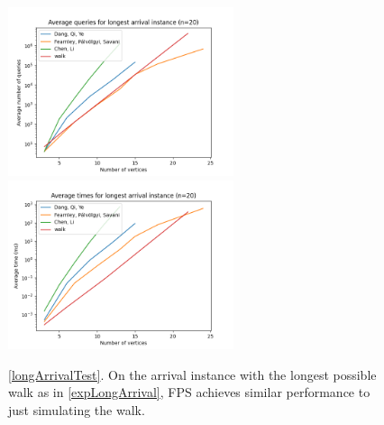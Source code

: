   \vspace{-22pt}
  \begin{figure}[H]
      \centering
      \includegraphics[width=2.6in]{plots/arrival_long_queries.png}
      \centering
      \includegraphics[width=2.6in]{plots/arrival_long_times.png}
      \caption{\cref{longArrivalTest}. On the arrival instance with the longest possible walk as in \cref{expLongArrival},
      FPS achieves similar performance to just simulating the walk.} \label{arrivalLongPlot}
  \end{figure}
  
